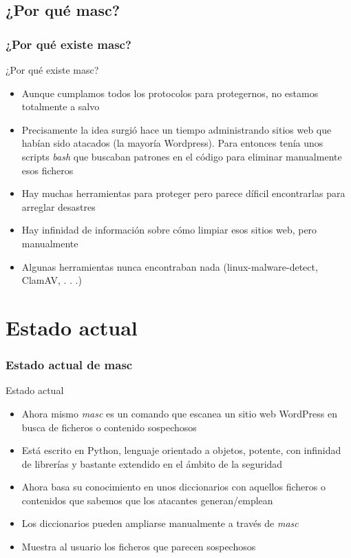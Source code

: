 \documentclass[xcolor={dvipsnames}]{beamer}
\begin{document}
\subsection{¿Por qué masc?}
\begin{frame}\frametitle{¿Por qué existe masc?}
    \begin{block}{¿Por qué existe masc?}
        \begin{itemize}
            \item Aunque cumplamos todos los protocolos para protegernos, no estamos totalmente a salvo
            \item Precisamente la idea surgió hace un tiempo administrando sitios web que habían sido atacados (la mayoría Wordpress). Para
            entonces tenía unos scripts \emph{bash} que buscaban patrones en el código para eliminar manualmente esos ficheros
            \item Hay muchas herramientas para proteger pero parece díficil encontrarlas para arreglar desastres
            \item Hay infinidad de información sobre cómo limpiar esos sitios web, pero manualmente
            \item Algunas herramientas nunca encontraban nada (linux-malware-detect, ClamAV, . . .)
        \end{itemize}
    \end{block}
\end{frame}

\section{Estado actual}
\begin{frame}\frametitle{Estado actual de masc}
    \begin{block}{Estado actual}
        \begin{itemize}
            \item Ahora mismo \emph{masc} es un comando que escanea un sitio web WordPress en busca de ficheros o contenido sospechosos
            \item Está escrito en Python, lenguaje orientado a objetos, potente, con infinidad de librerías y bastante extendido en el ámbito de la seguridad
            \item Ahora basa su conocimiento en unos diccionarios con aquellos ficheros o contenidos que sabemos que los atacantes generan/emplean
            \item Los diccionarios pueden ampliarse manualmente a través de \emph{masc}
            \item Muestra al usuario los ficheros que parecen sospechosos
        \end{itemize}
    \end{block}
\end{frame}
\end{document}
